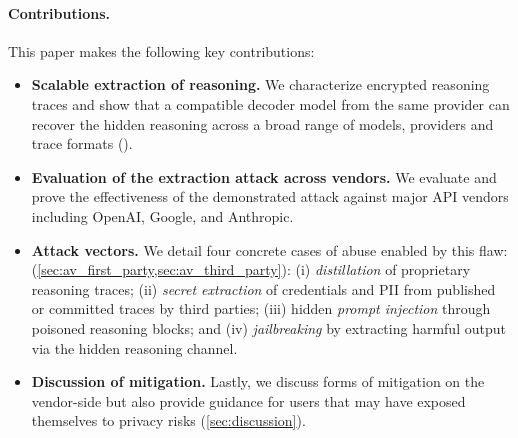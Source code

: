 \paragraph{Contributions.} This paper makes the following key contributions:
\begin{itemize}
\item \textbf{Scalable extraction of reasoning.} \;
We characterize encrypted reasoning traces and show that a compatible decoder model from the same provider can recover the hidden reasoning across a broad range of models, providers and trace formats ().

\item \textbf{Evaluation of the extraction attack across vendors.} \; We evaluate and prove the effectiveness of the demonstrated attack against major API vendors including OpenAI, Google, and Anthropic.
\item \textbf{Attack vectors.} \; We detail four concrete cases of abuse enabled by this flaw: (\cref{sec:av_first_party,sec:av_third_party}):
(i) \emph{distillation} of proprietary reasoning traces;
(ii) \emph{secret extraction} of credentials and PII from published or committed traces by third parties;
(iii) hidden \emph{prompt injection} through poisoned reasoning blocks; and
(iv) \emph{jailbreaking} by extracting harmful output via the hidden reasoning channel.
\item \textbf{Discussion of mitigation.} Lastly, we discuss forms of mitigation on the vendor-side but also provide guidance for users that may have exposed themselves to privacy risks (\cref{sec:discussion}).
\end{itemize}
